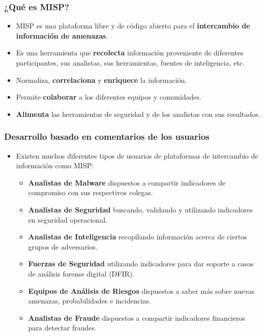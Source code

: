 \begin{frame}
\frametitle{¿Qué es MISP?}
\begin{itemize}
       \item MISP es una plataforma libre y de código abierto para el {\bf intercambio de información de amenazas}.
       \item Es una herramienta que {\bf recolecta} información proveniente de diferentes participantes, sus analistas, sus herramientas, fuentes de inteligencia, etc.
       \item Normaliza, {\bf correlaciona} y {\bf enriquece} la información.
       \item Permite {\bf colaborar} a los diferentes equipos y comunidades.
       \item {\bf Alimenta} las herramientas de seguridad y de los analistas con sus resultados.
\end{itemize}
\end{frame}

\begin{frame}
\frametitle{Desarrollo basado en comentarios de los usuarios}
\begin{itemize}
\item Existen muchos diferentes tipos de usuarios de plataformas de intercambio de información como MISP: 
        \begin{itemize}
                \item {\bf Analistas de Malware} dispuestos a compartir indicadores de compromiso con sus respectivos colegas.
                \item {\bf Analistas de Seguridad} buscando, validando y utilizando indicadores en seguridad operacional.
                \item {\bf Analistas de Inteligencia} recopilando información acerca de ciertos grupos de adversarios.
                \item {\bf Fuerzas de Seguridad} utilizando indicadores para dar soporte a casos de análisis forense digital (DFIR).
                \item {\bf Equipos de Análisis de Riesgos} dispuestos a saber más sobre nuevas amenazas, probabilidades e incidencias.
                \item {\bf Analistas de Fraude} dispuestos a compartir indicadores financieros para detectar fraudes.
        \end{itemize}
\end{itemize}
\end{frame}

